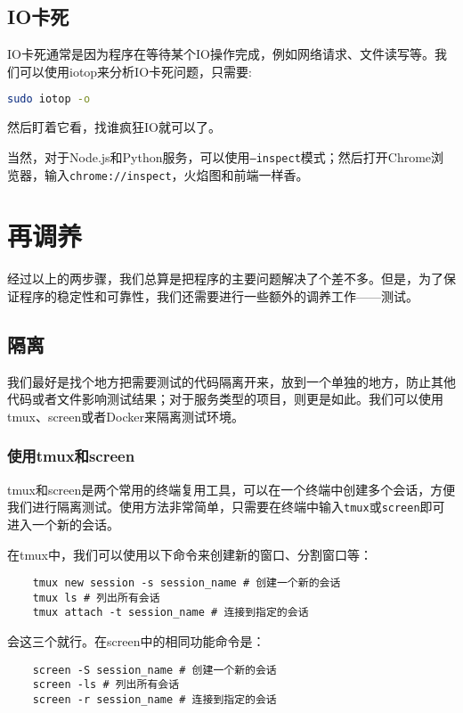 \documentclass[../main.tex]{subfiles}
\begin{document}
\subsection{IO卡死}

IO卡死通常是因为程序在等待某个IO操作完成，例如网络请求、文件读写等。我们可以使用iotop来分析IO卡死问题，只需要:
\begin{lstlisting}[language=bash]
    sudo iotop -o
\end{lstlisting}
然后盯着它看，找谁疯狂IO就可以了。

当然，对于Node.js和Python服务，可以使用\texttt{--inspect}模式；然后打开Chrome浏览器，输入\texttt{chrome://inspect}，火焰图和前端一样香。

\section{再调养}

经过以上的两步骤，我们总算是把程序的主要问题解决了个差不多。但是，为了保证程序的稳定性和可靠性，我们还需要进行一些额外的调养工作——测试。

\subsection{隔离}

我们最好是找个地方把需要测试的代码隔离开来，放到一个单独的地方，防止其他代码或者文件影响测试结果；对于服务类型的项目，则更是如此。我们可以使用tmux、screen或者Docker来隔离测试环境。

\subsubsection{使用tmux和screen}

tmux和screen是两个常用的终端复用工具，可以在一个终端中创建多个会话，方便我们进行隔离测试。使用方法非常简单，只需要在终端中输入\texttt{tmux}或\texttt{screen}即可进入一个新的会话。

在tmux中，我们可以使用以下命令来创建新的窗口、分割窗口等：
\begin{lstlisting}
    tmux new session -s session_name # 创建一个新的会话
    tmux ls # 列出所有会话
    tmux attach -t session_name # 连接到指定的会话
\end{lstlisting}
会这三个就行。在screen中的相同功能命令是：
\begin{lstlisting}
    screen -S session_name # 创建一个新的会话
    screen -ls # 列出所有会话
    screen -r session_name # 连接到指定的会话
\end{lstlisting}
\end{document}
